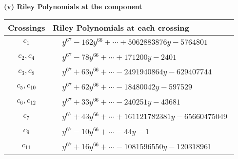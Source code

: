 \documentclass[1p]{elsarticle_modified}
\theoremstyle{definition}
\begin{document}
\newpage\renewcommand{\arraystretch}{1}
\flushleft \textbf{(v) Riley Polynomials at the component}\newline \\
\begin{tabular}{m{50pt}|m{274pt}}
Crossings & \hspace{64pt}Riley Polynomials at each crossing \\
\hline $$\begin{aligned}c_{1}\end{aligned}$$&$\begin{aligned}
&y^{67}-162 y^{66}+\cdots+5062883876 y-5764801
\end{aligned}$\\
\hline $$\begin{aligned}c_{2},c_{4}\end{aligned}$$&$\begin{aligned}
&y^{67}-78 y^{66}+\cdots+171200 y-2401
\end{aligned}$\\
\hline $$\begin{aligned}c_{3},c_{8}\end{aligned}$$&$\begin{aligned}
&y^{67}+63 y^{66}+\cdots-2491940864 y-629407744
\end{aligned}$\\
\hline $$\begin{aligned}c_{5},c_{10}\end{aligned}$$&$\begin{aligned}
&y^{67}+62 y^{66}+\cdots-18480042 y-597529
\end{aligned}$\\
\hline $$\begin{aligned}c_{6},c_{12}\end{aligned}$$&$\begin{aligned}
&y^{67}+33 y^{66}+\cdots-240251 y-43681
\end{aligned}$\\
\hline $$\begin{aligned}c_{7}\end{aligned}$$&$\begin{aligned}
&y^{67}+43 y^{66}+\cdots+161121782381 y-65660475049
\end{aligned}$\\
\hline $$\begin{aligned}c_{9}\end{aligned}$$&$\begin{aligned}
&y^{67}-10 y^{66}+\cdots-44 y-1
\end{aligned}$\\
\hline $$\begin{aligned}c_{11}\end{aligned}$$&$\begin{aligned}
&y^{67}+16 y^{66}+\cdots-1081596550 y-120318961
\end{aligned}$\\
\hline
\end{tabular}\\~\\
\end{document}

